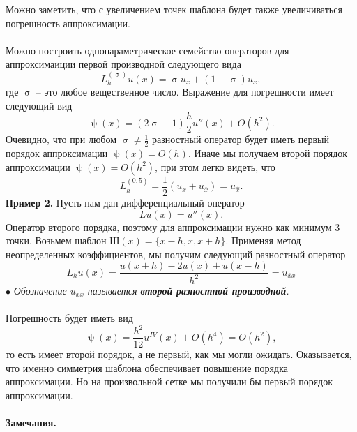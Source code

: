 \documentclass[a4paper, 12pt]{report}
\numberwithin{equation}{section}
\newcommand{\ol}{\overline}
\renewcommand{\sigma}{\upsigma}
\renewcommand{\psi}{\uppsi}
\begin{document}
Можно заметить, что с увеличением точек шаблона будет также увеличиваться погрешность аппроксимации.\\\\
Можно построить однопараметрическое семейство операторов для аппроксимаиции первой производной следующего вида $$L_h^{(\sigma)}u(x) = \sigma u_x + (1-\sigma)u_{\ol x},$$
где $\sigma$ -- это любое вещественное число. Выражение для погрешности имеет следующий вид
$$\psi(x) = (2\sigma - 1)\dfrac h2 u''(x) + O(h^2).$$
Очевидно, что при любом $\sigma \ne \frac 12$ разностный оператор будет иметь первый порядок аппроксимации $\psi(x) = O(h).$ Иначе мы получаем второй порядок аппроксимации $\psi(x) = O(h^2)$, при этом легко видеть, что $$L_h^{(0,5)} = \dfrac 12(u_x + u_{\ol x}) = u_{\hat x}.$$
\textbf{Пример 2.} Пусть нам дан дифференциальный оператор $$Lu(x) = u''(x).$$ Оператор второго порядка, поэтому для аппроксимации нужно как минимум 3 точки. Возьмем шаблон $\text{Ш}(x) = \{x-h, x, x+h\}$. Применяя метод неопределенных коэффициентов, мы получим следующий разностный оператор \begin{equation}
L_h u(x) = \dfrac{u(x+h) - 2u(x) + u(x-h)}{h^2}=u_{\ol xx}
\end{equation}
$\bullet$ \textit{Обозначение $u_{\ol x x}$ называется \textbf{второй разностной производной}.}\\\\
Погрешность будет иметь вид $$\psi(x) = \dfrac {h^2}{12} u^{IV}(x) + O(h^4) = O(h^2),$$ то есть имеет второй порядок, а не первый, как мы могли ожидать. Оказывается, что именно симметрия шаблона обеспечивает повышение порядка аппроксимации. Но на произвольной сетке мы получили бы первый порядок аппроксимации.\\\\
\textbf{Замечания.}
\end{document}
